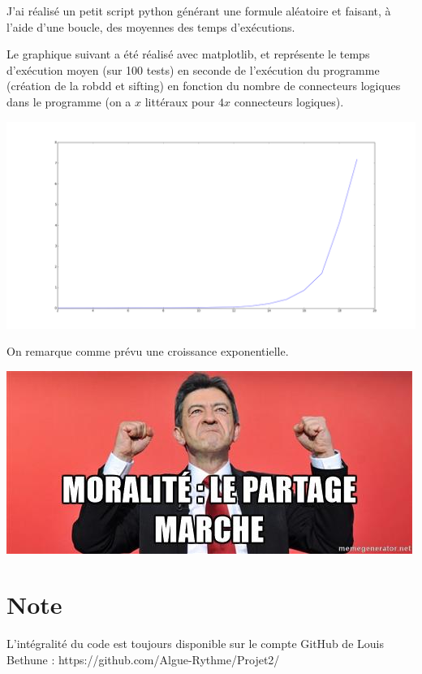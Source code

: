 \documentclass[a4paper,10pt]{article}
\begin{document}
J'ai réalisé un petit script python générant une formule aléatoire et faisant, à l'aide d'une boucle, des moyennes des temps d'exécutions.

Le graphique suivant a été réalisé avec matplotlib, et représente le temps d'exécution moyen (sur 100 tests) en seconde de l'exécution du programme (création de la robdd et sifting) en fonction du nombre de
connecteurs logiques dans le programme (on a $x$ littéraux pour $4x$ connecteurs logiques).

\begin{center}
\includegraphics[width=450pt]{benchmark.png}
\end{center}

On remarque comme prévu une croissance exponentielle.

\includegraphics{le_partage.jpg}

\section{Note}
L'intégralité du code est toujours disponible sur le compte GitHub de Louis Bethune : https://github.com/Algue-Rythme/Projet2/
\end{document}
